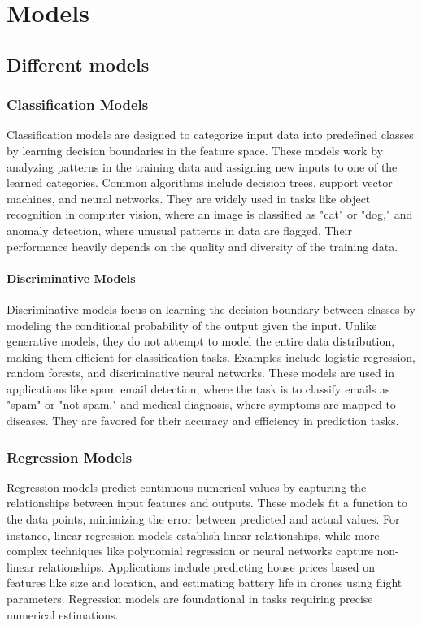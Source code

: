 \chapter{Models}
\section{Different models}
\subsection{Classification Models}
Classification models are designed to categorize input data into predefined classes by learning decision boundaries in the feature space. These models work by analyzing patterns in the training data and assigning new inputs to one of the learned categories. Common algorithms include decision trees, support vector machines, and neural networks. They are widely used in tasks like object recognition in computer vision, where an image is classified as "cat" or "dog," and anomaly detection, where unusual patterns in data are flagged. Their performance heavily depends on the quality and diversity of the training data. \cite{lecun-2015-deep-learning}
    \subsubsection{Discriminative Models}
Discriminative models focus on learning the decision boundary between classes by modeling the conditional probability of the output given the input. Unlike generative models, they do not attempt to model the entire data distribution, making them efficient for classification tasks. Examples include logistic regression, random forests, and discriminative neural networks. These models are used in applications like spam email detection, where the task is to classify emails as "spam" or "not spam," and medical diagnosis, where symptoms are mapped to diseases. They are favored for their accuracy and efficiency in prediction tasks. \cite{ng-2002-discriminative-generative}


\subsection{Regression Models}
Regression models predict continuous numerical values by capturing the relationships between input features and outputs. These models fit a function to the data points, minimizing the error between predicted and actual values. For instance, linear regression models establish linear relationships, while more complex techniques like polynomial regression or neural networks capture non-linear relationships. Applications include predicting house prices based on features like size and location, and estimating battery life in drones using flight parameters. Regression models are foundational in tasks requiring precise numerical estimations. \cite{hastie-2009-elements-statistical-learning}

